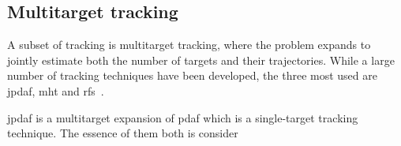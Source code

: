\subsection{Multitarget tracking}
A subset of tracking is multitarget tracking, where the problem expands to jointly estimate both the number of targets and their trajectories. While a large number of tracking techniques have been developed, the three most used are \gls{jpdaf}, \gls{mht} and \gls{rfs}~\cite{Vo2015}.

\gls{jpdaf} is a multitarget expansion of \gls{pdaf} which is a single-target tracking technique. The essence of them both is consider 


